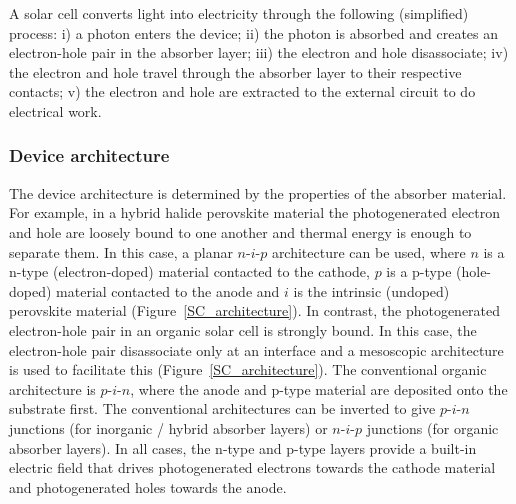 
A solar cell converts light into electricity through the following (simplified) process: i) a photon enters the device; ii) the photon is absorbed and creates an electron-hole pair in the absorber layer; iii) the electron and hole disassociate; iv) the electron and hole travel through the absorber layer to their respective contacts; v) the electron and hole are extracted to the external circuit to do electrical work.

\subsubsection{Device architecture}
The device architecture is determined by the properties of the absorber material. For example, in a hybrid halide perovskite material the photogenerated electron and hole are loosely bound to one another and thermal energy is enough to separate them. In this case, a planar $n$-$i$-$p$ architecture can be used, where $n$ is a n-type (electron-doped) material contacted to the cathode, $p$ is a p-type (hole-doped) material contacted to the anode and $i$ is the intrinsic (undoped) perovskite material (Figure\ \ref{SC_architecture}). In contrast, the photogenerated electron-hole pair in an organic solar cell is strongly bound. In this case, the electron-hole pair disassociate only at an interface and a mesoscopic architecture is used to facilitate this (Figure\ \ref{SC_architecture}). The conventional organic architecture is $p$-$i$-$n$, where the anode and p-type material are deposited onto the substrate first. The conventional architectures can be inverted to give $p$-$i$-$n$ junctions (for inorganic / hybrid absorber layers) or $n$-$i$-$p$ junctions (for organic absorber layers). In all cases, the n-type and p-type layers provide a built-in electric field that drives photogenerated electrons towards the cathode material and photogenerated holes towards the anode.

